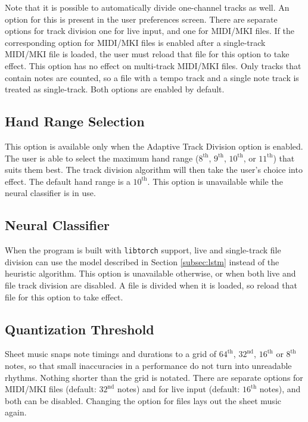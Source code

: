 \documentclass[english]{article}
\providecommand{\mi}[1]{\texttt{#1}}
\begin{document}
Note that it is possible to automatically divide one-channel tracks as well. An option for this is present in the user
preferences screen. There are separate options for track division \textendash{} one for live input, and one for MIDI/MKI files.
If the corresponding option for MIDI/MKI files is enabled after a single-track MIDI/MKI file is loaded, the user must reload
that file for this option to take effect. This option has no effect on multi-track MIDI/MKI files. Only tracks that contain
notes are counted, so a file with a tempo track and a single note track is treated as single-track. Both options are enabled
by default.

\subsection{Hand Range Selection}

This option is available only when the Adaptive Track Division option is enabled. The user is able to select the 
maximum hand range ($8^\text{th}$, $9^\text{th}$, $10^\text{th}$, or $11^\text{th}$) that suits them best. The 
track division algorithm will then take the user's choice into effect. The default hand range is a $10^\text{th}$.
This option is unavailable while the neural classifier is in use.

\subsection{Neural Classifier}

When the program is built with \mi{libtorch} support, live and single-track file division can use the model described in Section
\textcolor{lcol}{\hyperref[subsec:lstm]{\ref{subsec:lstm}}} instead of the heuristic algorithm. This option is unavailable
otherwise, or when both live and file track division are disabled. A file is divided when it is loaded, so reload
that file for this option to take effect.

\subsection{Quantization Threshold}
\label{subsec:quantize}

Sheet music snaps note timings and durations to a grid of $64^\text{th}$, $32^\text{nd}$, $16^\text{th}$ or $8^\text{th}$
notes, so that small inaccuracies in a performance do not turn into unreadable rhythms. Nothing shorter than the grid is
notated. There are separate options for MIDI/MKI files (default: $32^\text{nd}$ notes) and for live input
(default: $16^\text{th}$ notes), and both can be disabled. Changing the option for files lays out the sheet music again.
\end{document}
